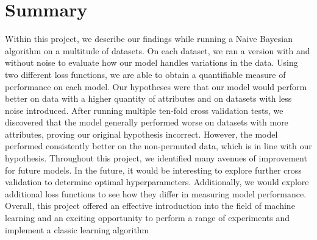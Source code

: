 \documentclass[twoside,11pt]{article}
\begin{document}
\section{Summary}
Within this project, we describe our findings while running a Naive Bayesian algorithm on a multitude of datasets. On each dataset, we ran a version with and without noise to evaluate how our model handles variations in the data. Using two different loss functions, we are able to obtain a quantifiable measure of performance on each model. Our hypotheses were that our model would perform better on data with a higher quantity of attributes and on datasets with less noise introduced. After running multiple ten-fold cross validation tests, we discovered that the model generally performed worse on datasets with more attributes, proving our original hypothesis incorrect. However, the model performed consistently better on the non-permuted data, which is in line with our hypothesis. Throughout this project, we identified many avenues of improvement for future models. In the future, it would be interesting to explore further cross validation to determine optimal hyperparameters. Additionally, we would explore additional loss functions to see how they differ in measuring model performance. Overall, this project offered an effective introduction into the field of machine learning and an exciting opportunity to perform a range of experiments and implement a classic learning algorithm

\vskip 0.2in

\end{document}

